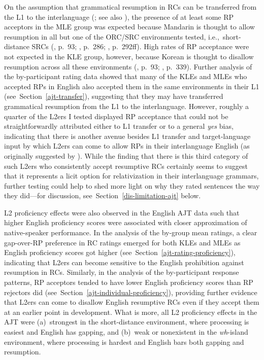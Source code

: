 On the assumption that grammatical resumption in RCs can be transferred from the L1 to the interlanguage (\cite{hyltenstam1984,hyltenstam1990}; see also \cite{schwartz.sprouse1994,schwartz.sprouse1996}), the presence of at least some RP acceptors in the MLE group was expected because Mandarin is thought to allow resumption in all but one of the ORC/SRC environments tested, i.e.,~short-distance SRCs (\cite{keenan.comrie1977}, p.~93; \cite{li.wei2014}, p.~286; \cite{pan2016}, p.~292ff). High rates of RP acceptance were not expected in the KLE group, however, because Korean is thought to disallow resumption across all these environments (\cite{keenan.comrie1977}, p.~93; \cite{han2013}, p.~339). Further analysis of the by-participant rating data showed that many of the KLEs and MLEs who accepted RPs in English also accepted them in the same environments in their L1 (see~Section~\ref{ajt-transfer}), suggesting that they may have transferred grammatical resumption from the L1 to the interlanguage. However, roughly a quarter of the L2ers I tested displayed RP acceptance that could not be straightforwardly attributed either to L1 transfer or to a general \textit{yes} bias, indicating that there is another avenue besides L1 transfer and target-language input by which L2ers can come to allow RPs in their interlanguage English (as originally suggested by \cite{hyltenstam1984}). While the finding that there is this third category of such L2ers who consistently accept resumptive RCs certainly seems to suggest that it represents a licit option for relativization in their interlanguage grammars, further testing could help to shed more light on why they rated sentences the way they did---for discussion, see~Section~\ref{dis-limitation-ajt} below.

L2 proficiency effects were also observed in the English AJT data such that higher English proficiency scores were associated with closer approximation of native-speaker performance. In the analysis of the by-group mean ratings, a clear gap-over-RP preference in RC ratings emerged for both KLEs and MLEs as English proficiency scores got higher (see~Section~\ref{ajt-rating-proficiency}), indicating that L2ers can become sensitive to the English prohibition against resumption in RCs. Similarly, in the analysis of the by-participant response patterns, RP acceptors tended to have lower English proficiency scores than RP rejectors\footnotemark{} did (see~Section~\ref{ajt-individual-proficiency}), providing further evidence that L2ers can come to disallow English resumptive RCs even if they accept them at an earlier point in development. What is more, all L2 proficiency effects in the AJT were (a)~strongest in the short-distance environment, where processing is easiest and English has gapping, and (b)~weak or nonexistent in the \textit{wh}-island environment, where processing is hardest and English bars both gapping and resumption.

